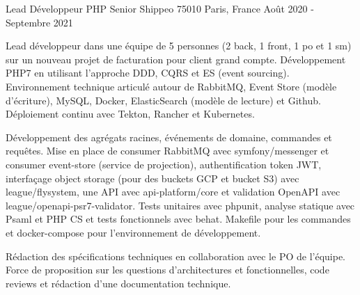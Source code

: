 \cventry
{Lead Développeur PHP Senior} %
{Shippeo} %
{75010 Paris, France} %
{Août 2020 - Septembre 2021} %
{
\begin{cvitems} %
    \item
    {
        Lead développeur dans une équipe de 5 personnes (2 back, 1 front, 1 po et 1 sm) sur un nouveau projet de facturation
        pour client grand compte. Développement PHP7 en utilisant l'approche DDD, CQRS et ES (event sourcing). Environnement 
        technique articulé autour de RabbitMQ, Event Store (modèle d'écriture), MySQL, Docker, ElasticSearch (modèle de lecture) et Github. 
        Déploiement continu avec Tekton, Rancher et Kubernetes.
    }
    \item
    {
	Développement des agrégats racines, événements de domaine, commandes et requêtes. Mise en place de consumer RabbitMQ 
	avec symfony/messenger et consumer event-store (service de projection), authentification token JWT, interfaçage object 
	storage (pour des buckets GCP et bucket S3) avec league/flysystem, une API avec api-platform/core et validation OpenAPI 
	avec league/openapi-psr7-validator. Tests unitaires avec phpunit, analyse statique avec Psaml et PHP CS et tests fonctionnels avec behat. 
	Makefile pour les commandes et docker-compose pour l'environnement de développement.
    }
    \item
    {
        Rédaction des spécifications techniques en collaboration avec le PO de l'équipe. Force de proposition sur 
        les questions d’architectures et fonctionnelles, code reviews et rédaction d'une documentation technique.
    }
\end{cvitems}
}
